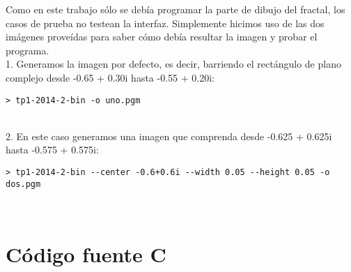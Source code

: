 \documentclass[a4paper,10pt]{article}
\begin{document}
Como en este trabajo s\'olo se deb\'ia programar la parte de dibujo del fractal, los casos de prueba 
no testean la interfaz. Simplemente hicimos uso de las dos im\'agenes prove\'idas para saber c\'omo 
deb\'ia resultar la imagen y probar el programa.\\

1. Generamos la imagen por defecto, es decir, barriendo el rect\'angulo de plano complejo desde 
-0.65 + 0.30i hasta -0.55 + 0.20i:
\begin{verbatim}
> tp1-2014-2-bin -o uno.pgm
\end{verbatim}
\\

2. En este caso generamos una imagen que comprenda desde -0.625 + 0.625i hasta -0.575 + 0.575i:
\begin{verbatim}
> tp1-2014-2-bin --center -0.6+0.6i --width 0.05 --height 0.05 -o dos.pgm
\end{verbatim}
\\



\section{C\'odigo fuente C}
\end{document}
